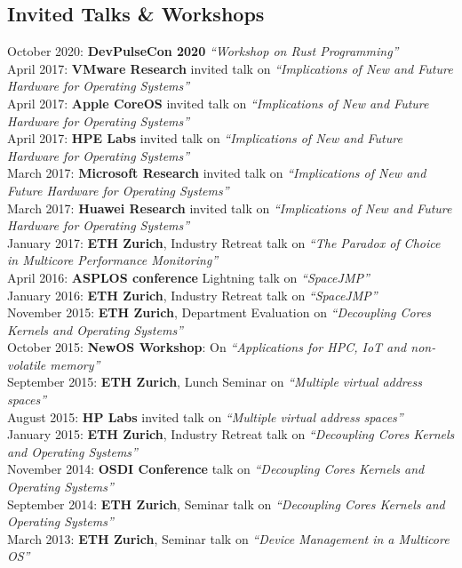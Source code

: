 \documentclass[margin,line]{cv}
\begin{document}
\begin{resume}
    \section{\mysidestyle Invited Talks \& Workshops}

    October 2020: \textbf{DevPulseCon 2020} \textit{``Workshop on Rust Programming''}\\
    April 2017: \textbf{VMware Research} invited talk on \textit{``Implications of New and Future Hardware for Operating Systems''}\\
    April 2017: \textbf{Apple CoreOS} invited talk on \textit{``Implications of New and Future Hardware for Operating Systems''}\\
    April 2017: \textbf{HPE Labs} invited talk on \textit{``Implications of New and Future Hardware for Operating Systems''}\\
    March 2017: \textbf{Microsoft Research} invited talk on \textit{``Implications of New and Future Hardware for Operating Systems''}\\
    March 2017: \textbf{Huawei Research} invited talk on \textit{``Implications of New and Future Hardware for Operating Systems''}\\
    January 2017: \textbf{ETH Zurich}, Industry Retreat talk on \textit{``The Paradox of Choice in Multicore Performance Monitoring''}\\
    April 2016: \textbf{ASPLOS conference} Lightning talk on \textit{``SpaceJMP''}\\
    January 2016: \textbf{ETH Zurich}, Industry Retreat talk on \textit{``SpaceJMP''}\\
    November 2015: \textbf{ETH Zurich}, Department Evaluation on \textit{``Decoupling Cores Kernels and Operating Systems''}\\
    October 2015: \textbf{NewOS Workshop}: On \textit{``Applications for HPC, IoT and non-volatile memory''}\\
    September 2015: \textbf{ETH Zurich}, Lunch Seminar on \textit{``Multiple virtual address spaces''}\\
    August 2015: \textbf{HP Labs} invited talk on \textit{``Multiple virtual address spaces''}\\
    January 2015: \textbf{ETH Zurich}, Industry Retreat talk on \textit{``Decoupling Cores Kernels and Operating Systems''}\\
    November 2014: \textbf{OSDI Conference} talk on \textit{``Decoupling Cores Kernels and Operating Systems''}\\
    September 2014: \textbf{ETH Zurich}, Seminar talk on \textit{``Decoupling Cores Kernels and Operating Systems''}\\
    March 2013: \textbf{ETH Zurich}, Seminar talk on \textit{``Device Management in a Multicore OS''}\\


\end{resume}
\end{document}
